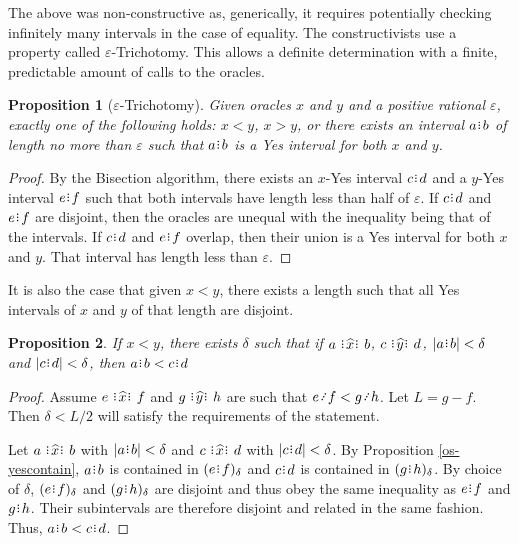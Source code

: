 \documentclass[12pt]{article}
\newtheorem{proposition}{Proposition}[section]
\begin{document}
The above was non-constructive as, generically, it requires potentially checking infinitely many intervals in the case of equality. The constructivists use a property called $\varepsilon$-Trichotomy. This allows a definite determination with a finite, predictable amount of calls to the oracles. 

\begin{proposition}[$\varepsilon$-Trichotomy]
    Given oracles $x$ and $y$ and a positive rational $\varepsilon$, exactly one of the following holds:  $x<y$, $x>y$, or there exists an interval $a\rint b$ of length no more than $\varepsilon$ such that $a\rint b$ is a Yes interval for both $x$ and $y$.
\end{proposition}

\begin{proof}
    By the Bisection algorithm, there exists an $x$-Yes interval $c\rint d$ and a $y$-Yes interval $e\rint f$ such that both intervals have length less than half of $\varepsilon$. If $c\rint d$ and $e\rint f$ are disjoint, then the oracles are unequal with the inequality being that of the intervals. If $c\rint d$ and $e\rint f$ overlap, then their union is a Yes interval for both $x$ and $y$. That interval has length less than $\varepsilon$.
\end{proof}

It is also the case that given $x < y$, there exists a length such that all Yes intervals of $x$ and $y$ of that length are disjoint. 

\begin{proposition}
    If $ x< y$, there exists $\delta$ such that if $a \xora b$, $c \xora[y] d$, $|a\rint b| < \delta$ and $|c\rint d| < \delta$, then $a\rint b < c\rint d$
\end{proposition}

\begin{proof}
    Assume $e \xora f$ and $g \xora[y] h$ are such that $e\lte f < g \lte h$. Let $L = g-f$. Then $\delta < L/2$ will satisfy the requirements of the statement. 

    Let $a \xora b$ with $|a\rint b| < \delta$ and $c \xora d$ with $|c\rint d| < \delta$. By Proposition \ref{os-yescontain}, $a\rint b$ is contained in $\halo{e\rint f}$ and $c\rint d$ is contained in $\halo{g\rint h}$. By choice of $\delta$, $\halo{e\rint f}$ and $\halo{g\rint h}$ are disjoint and thus obey the same inequality as $e\rint f$ and $g\rint h$. Their subintervals are therefore disjoint and related in the same fashion. Thus, $a\rint b < c\rint d$. 
\end{proof}
\end{document}
